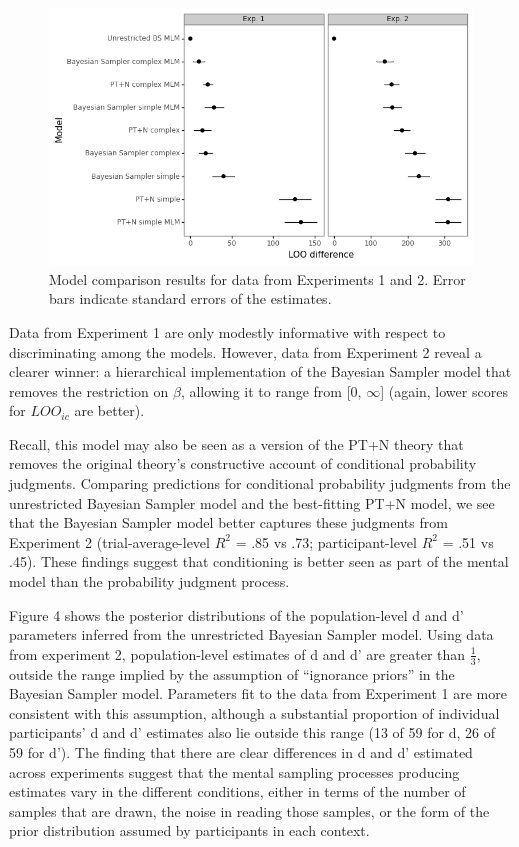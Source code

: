 \documentclass[
  english,
  man,floatsintext]{apa6}
\begin{document}
\begin{figure}[ht]
\centering
\includegraphics[width=6in]{plot_compare.png}
\caption{Model comparison results for data from Experiments 1 and 2. Error bars indicate standard errors of the estimates.}
\end{figure}

Data from Experiment 1 are only modestly informative with respect to discriminating among the models. However, data from Experiment 2 reveal a clearer winner: a hierarchical implementation of the Bayesian Sampler model that removes the restriction on \(\beta\), allowing it to range from {[}0, \(\infty\){]} (again, lower scores for \(LOO_{ic}\) are better).

Recall, this model may also be seen as a version of the PT+N theory that removes the original theory's constructive account of conditional probability judgments. Comparing predictions for conditional probability judgments from the unrestricted Bayesian Sampler model and the best-fitting PT+N model, we see that the Bayesian Sampler model better captures these judgments from Experiment 2 (trial-average-level \(R^2\) = .85 vs .73; participant-level \(R^2\) = .51 vs .45). These findings suggest that conditioning is better seen as part of the mental model than the probability judgment process.

Figure 4 shows the posterior distributions of the population-level d and d' parameters inferred from the unrestricted Bayesian Sampler model. Using data from experiment 2, population-level estimates of d and d' are greater than \(\frac{1}{3}\), outside the range implied by the assumption of ``ignorance priors'' in the Bayesian Sampler model. Parameters fit to the data from Experiment 1 are more consistent with this assumption, although a substantial proportion of individual participants' d and d' estimates also lie outside this range (13 of 59 for d, 26 of 59 for d'). The finding that there are clear differences in d and d' estimated across experiments suggest that the mental sampling processes producing estimates vary in the different conditions, either in terms of the number of samples that are drawn, the noise in reading those samples, or the form of the prior distribution assumed by participants in each context.
\end{document}
